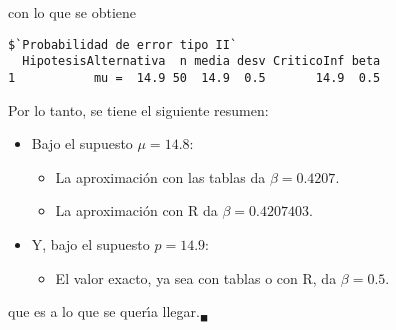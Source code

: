 \begin{solucion}
\begin{enumerate}
  con lo que se obtiene
  \begin{verbatim}
$`Probabilidad de error tipo II`
  HipotesisAlternativa  n media desv CriticoInf beta
1           mu =  14.9 50  14.9  0.5       14.9  0.5
  \end{verbatim}
  \vspace{-0.5cm}
  Por lo tanto, se tiene el siguiente resumen:
  \begin{itemize}
   \item Bajo el supuesto $\mu = 14.8$:
   \begin{itemize}
    \item La aproximaci\'on con las tablas da $\beta = 0.4207$.
    \item La aproximaci\'on con R da $\beta = 0.4207403$.
   \end{itemize}
   
   \item Y, bajo el supuesto $p = 14.9$:
   \begin{itemize}
    \item El valor exacto, ya sea con tablas o con R, da $\beta = 0.5$.
   \end{itemize}
  \end{itemize}
  que es a lo que se quer\'{\i}a llegar.${}_{\blacksquare}$
 \end{enumerate}
\end{solucion}
